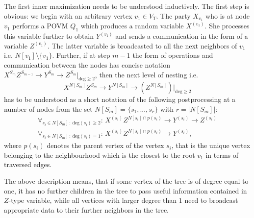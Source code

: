 \documentclass[aps,pra,twocolumn,superscriptaddress,longbibliography]{revtex4-1}
\begin{document}
    
    The first inner maximization needs to be understood inductively. The first step is obvious:
    we begin with an arbitrary vertex  $v_1\in V_T$. The party $X_{v_1}$ who is at node $v_1$ performs a POVM $Q_{1}$
    which produces a random variable $X^{(v_1)}$. She processes this variable further to obtain $Y^{(v_1)}$
    and sends a communication in the form of a variable $Z^{(v_1)}$. The latter variable is broadcasted to all the next neighbors of $v_1$ i.e. $N[v_1] \setminus \{v_1\}$. Further, if at step $m-1$ the form of operations 
    and communication between the nodes has concise notation $X^{S_m}Z^{S_{m-1}}\rightarrow Y^{S_m} \rightarrow Z^{S_m}|_{\mbox{deg}\geq 2}$,
    then the next level of nesting i.e. 
    \begin{equation}
    X^{N[S_m]}Z^{S_{m}}\rightarrow Y^{N[S_m]} \rightarrow \left(Z^{N[S_m]}\right)|_{\mbox{deg}\geq 2}
    \end{equation}
    has to be understood as a short notation of the following postprocessing at a number of nodes
    from the set $N[S_m] = \{s_1,...,s_{r}\}$ with $r=|N[S_m]|$: 
    \begin{eqnarray}
    \forall_{s_i \in N[S_m]\,:\, \mbox{deg}(s_i)\geq 2}: \,X^{(s_i)} Z^{N[s_i]\cap p(s_i)} \rightarrow  Y^{(s_i)}\rightarrow Z^{(s_i)} \nonumber \\
    \forall_{s_i \in N[S_m]\,:\, \mbox{deg}(s_i)=1}: \,X^{(s_i)} Z^{N[s_i]\cap p(s_i)} \rightarrow  Y^{(s_i)}, \nonumber
    \end{eqnarray}
    where $p(s_i)$ denotes the parent vertex of the vertex $s_i$, that is the unique vertex belonging to the neighbourhood which is the closest to the root $v_1$ in terms of traversed edges.
   
    
The above description means, that if some vertex of the tree is of degree equal to one, it has no further
children in the tree to pass useful information contained in $Z$-type variable, while all vertices with
larger degree than $1$ need to broadcast appropriate data to their further neighbors in the tree.
\end{document}
